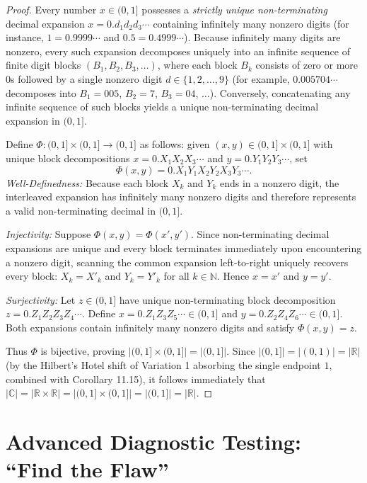 \documentclass[11pt, letterpaper]{article}
\theoremstyle{definition}
\theoremstyle{remark}
\begin{document}
\begin{proof}
Every number $x \in (0, 1]$ possesses a \emph{strictly unique non-terminating} decimal expansion $x = 0.d_1 d_2 d_3 \cdots$ containing infinitely many nonzero digits (for instance, $1 = 0.9999\cdots$ and $0.5 = 0.4999\cdots$). Because infinitely many digits are nonzero, every such expansion decomposes uniquely into an infinite sequence of finite digit blocks $(B_1, B_2, B_3, \dots)$, where each block $B_k$ consists of zero or more $0$s followed by a single nonzero digit $d \in \{1, 2, \dots, 9\}$ (for example, $0.005704\cdots$ decomposes into $B_1 = 005$, $B_2 = 7$, $B_3 = 04$, $\dots$). Conversely, concatenating any infinite sequence of such blocks yields a unique non-terminating decimal expansion in $(0, 1]$.

Define $\Phi : (0, 1] \times (0, 1] \to (0, 1]$ as follows: given $(x, y) \in (0, 1] \times (0, 1]$ with unique block decompositions $x = 0.X_1 X_2 X_3 \cdots$ and $y = 0.Y_1 Y_2 Y_3 \cdots$, set
\[
\Phi(x, y) = 0.X_1 Y_1 X_2 Y_2 X_3 Y_3 \cdots.
\]
\emph{Well-Definedness:} Because each block $X_k$ and $Y_k$ ends in a nonzero digit, the interleaved expansion has infinitely many nonzero digits and therefore represents a valid non-terminating decimal in $(0, 1]$.

\emph{Injectivity:} Suppose $\Phi(x, y) = \Phi(x', y')$. Since non-terminating decimal expansions are unique and every block terminates immediately upon encountering a nonzero digit, scanning the common expansion left-to-right uniquely recovers every block: $X_k = X'_k$ and $Y_k = Y'_k$ for all $k \in \mathbb{N}$. Hence $x = x'$ and $y = y'$.

\emph{Surjectivity:} Let $z \in (0, 1]$ have unique non-terminating block decomposition $z = 0.Z_1 Z_2 Z_3 Z_4 \cdots$. Define $x = 0.Z_1 Z_3 Z_5 \cdots \in (0, 1]$ and $y = 0.Z_2 Z_4 Z_6 \cdots \in (0, 1]$. Both expansions contain infinitely many nonzero digits and satisfy $\Phi(x, y) = z$.

Thus $\Phi$ is bijective, proving $|(0, 1] \times (0, 1]| = |(0, 1]|$. Since $|(0, 1]| = |(0, 1)| = |\mathbb{R}|$ (by the Hilbert's Hotel shift of Variation 1 absorbing the single endpoint $1$, combined with Corollary 11.15), it follows immediately that $|\mathbb{C}| = |\mathbb{R} \times \mathbb{R}| = |(0, 1] \times (0, 1]| = |(0, 1]| = |\mathbb{R}|$.
\end{proof}

\section{Advanced Diagnostic Testing: ``Find the Flaw''}
\end{document}
